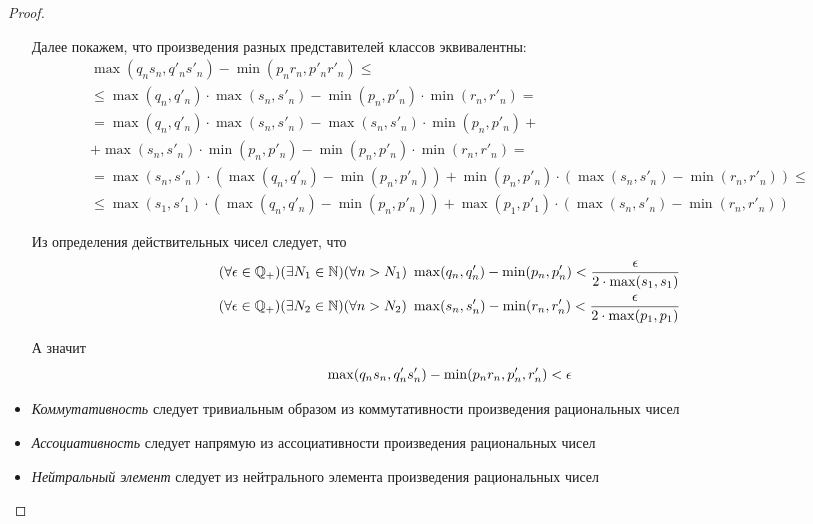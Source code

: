 \begin{proof}
\begin{itemize}
            Далее покажем, что произведения разных представителей классов эквивалентны:
            \begin{multline*}
                \max(q_n s_n, q'_n s'_n) - \min(p_n r_n, p'_n r'_n) \le \\
                \le \max(q_n, q'_n) \cdot \max(s_n, s'_n) - \min(p_n, p'_n)
                \cdot \min(r_n, r'_n) = \\
                = \max(q_n, q'_n) \cdot \max(s_n, s'_n) - \max(s_n, s'_n)
                \cdot \min(p_n, p'_n) + \\
                + \max(s_n, s'_n) \cdot \min(p_n, p'_n) - \min(p_n, p'_n)
                \cdot \min(r_n, r'_n) = \\
                = \max(s_n, s'_n) \cdot (\max(q_n, q'_n) - \min(p_n, p'_n))
                + \min(p_n, p'_n) \cdot (\max(s_n, s'_n) - \min(r_n, r'_n)) \le \\
                \le \max(s_1, s'_1) \cdot (\max(q_n, q'_n) - \min(p_n, p'_n)) +
                \max(p_1, p'_1) \cdot (\max(s_n, s'_n) - \min(r_n, r'_n))
            \end{multline*}
            
            Из определения действительных чисел следует, что
            \begin{align*}
                (\forall \epsilon \in \mathbb{Q}_+)(\exists N_1 \in \mathbb{N})
                (\forall n > N_1)\ \max(q_n, q'_n) - \min(p_n, p'_n)
                < \frac{\epsilon}{2 \cdot \max(s_1, s_1)}
                \\
                (\forall \epsilon \in \mathbb{Q}_+)(\exists N_2 \in \mathbb{N})
                (\forall n > N_2)\ \max(s_n, s'_n) - \min(r_n, r'_n)
                < \frac{\epsilon}{2 \cdot \max(p_1, p_1)}
            \end{align*}
            
            А значит
            \[
                \max(q_n s_n, q'_n s'_n) - \min(p_n r_n, p'_n, r'_n) < \epsilon
            \]
        \item \textit{Коммутативность} следует тривиальным образом
            из коммутативности произведения рациональных чисел
        \item \textit{Ассоциативность} следует напрямую из ассоциативности
            произведения рациональных чисел
        \item \textit{Нейтральный элемент} следует из нейтрального элемента
            произведения рациональных чисел
    \end{itemize}
\end{proof}


